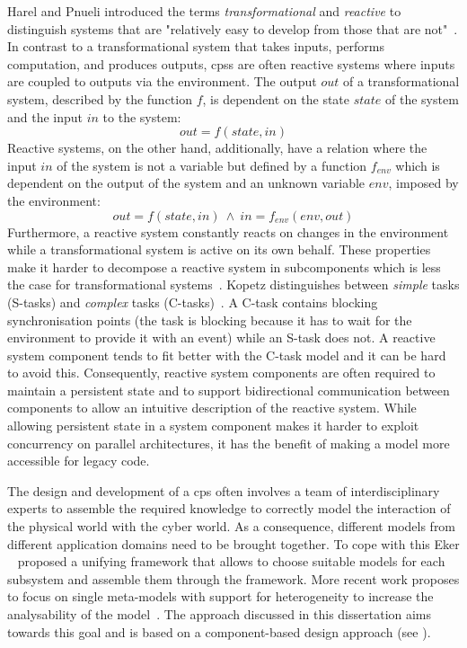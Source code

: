 Harel and Pnueli introduced the terms \emph{transformational} and \emph{reactive} to distinguish systems that are "relatively easy to develop from those that are not"~\cite{harel1985}.
In contrast to a transformational system that takes inputs, performs computation, and produces outputs, \glspl{cps} are often reactive systems where inputs are coupled to outputs via the environment.
The output $out$ of a transformational system, described by the function $f$, is dependent on the state $state$ of the system and the input $in$ to the system:
$$out = f(state,in)$$
Reactive systems, on the other hand, additionally, have a relation where the input $in$ of the system is not a variable but defined by a function $f_{env}$ which is dependent on the output of the system and an unknown variable $env$, imposed by the environment:
$$out = f(state,in) \ \land \ in = f_{env}(env,out)$$
Furthermore, a reactive system constantly reacts on changes in the environment while a transformational system is active on its own behalf.
These properties make it harder to decompose a reactive system in subcomponents which is less the case for transformational systems~\cite{harel1985}.
Kopetz distinguishes between \emph{simple} tasks (S-tasks) and \emph{complex} tasks (C-tasks)~\cite{kopetz2011a}.
A C-task contains blocking synchronisation points (\eg the task is blocking because it has to wait for the environment to provide it with an event) while an S-task does not.
A reactive system component tends to fit better with the C-task model and it can be hard to avoid this.
Consequently, reactive system components are often required to maintain a persistent state and to support bidirectional communication between components to allow an intuitive description of the reactive system.
While allowing persistent state in a system component makes it harder to exploit concurrency on parallel architectures, it has the benefit of making a model more accessible for legacy code.

The design and development of a \gls{cps} often involves a team of interdisciplinary experts to assemble the required knowledge to correctly model the interaction of the physical world with the cyber world.
As a consequence, different models from different application domains need to be brought together.
To cope with this Eker \etal~\cite{eker2003} proposed a unifying framework that allows to choose suitable models for each subsystem and assemble them through the framework.
More recent work proposes to focus on single meta-models with support for heterogeneity to increase the analysability of the model~\cite{henzinger2006, rajkumar2010, castrillon2015}.
The approach discussed in this dissertation aims towards this goal and is based on a component-based design approach (see \Sect{\ref{sect_background_comp}}).

